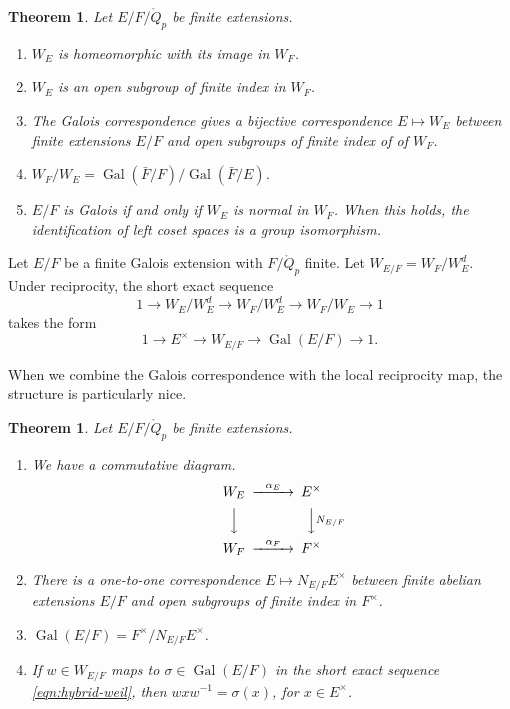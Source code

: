 \documentclass{amsart}
\newtheorem{theorem}[equation]{Theorem}
\def\op#1{{\operatorname{#1}}}
\def\oG{\op{Gal}}
\begin{document}
\begin{theorem} Let $E/F/\ring{Q}_p$ be finite extensions. 
\begin{enumerate}
\item  $W_E$ is homeomorphic with its image in $W_F$.
\item $W_E$ is an open subgroup of finite index in $W_F$.
\item The Galois correspondence gives a bijective correspondence $E\mapsto W_E$ between
finite extensions $E/F$ and open subgroups  of finite index of of $W_F$.
\item $W_F/W_E = \oG(\bar F/F)/\oG(\bar F/E)$.
\item $E/F$ is Galois if and only if $W_E$ is normal in $W_F$.  When this holds,
the identification of left coset spaces is a group isomorphism.
\end{enumerate}
\end{theorem}

Let $E/F$ be a finite Galois extension with $F/\ring{Q}_p$ finite.
Let $W_{E/F} = W_F/ W^d_E$.  Under reciprocity, the short exact
sequence
\[
1 \to W_E/W_E^d \to W_F/W^d_E \to W_F/W_E \to 1
\]
takes the form
\begin{equation}\label{eqn:hybrid-weil}
1 \to E^\times \to W_{E/F} \to \oG(E/F) \to 1.
\end{equation}

When we combine the Galois correspondence with the local reciprocity
map, the structure is particularly nice.

\begin{theorem}  Let $E/F/\ring{Q}_p$ be finite extensions.  
\begin{enumerate}
\item We have a commutative diagram.
\[
\begin{CD}
W_E @>\alpha_E>> E^\times\\
@VVV @VVN_{E/F}V\\
W_F @>\alpha_F >> F^\times\\
\end{CD}
\]
\item There is a one-to-one correspondence $E\mapsto N_{E/F}E^\times$
between finite abelian extensions
$E/F$ and open subgroups of finite index in $F^\times$.
\item $\oG(E/F) = F^\times/N_{E/F}E^\times$.
\item If $w\in W_{E/F}$ maps to $\sigma\in \oG(E/F)$ in the short exact
sequence \eqref{eqn:hybrid-weil}, then $w x w^{-1} = \sigma(x)$, for $x \in E^\times$.
\end{enumerate}
\end{theorem}
\end{document}
